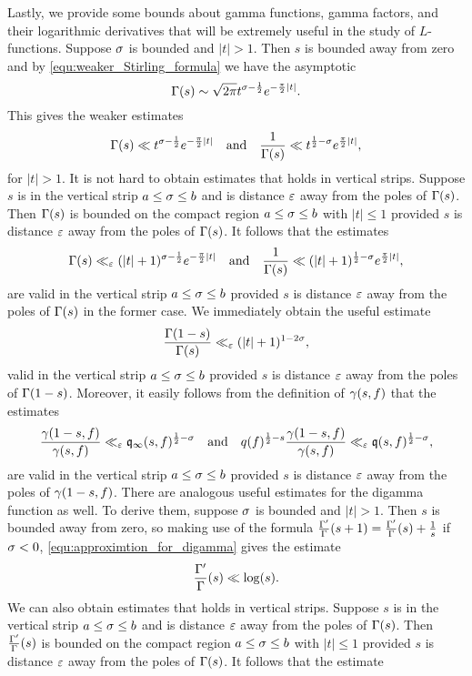     Lastly, we provide some bounds about gamma functions, gamma factors, and their logarithmic derivatives that will be extremely useful in the study of $L$-functions. Suppose $\sigma$ is bounded and $|t| > 1$. Then $s$ is bounded away from zero and by \cref{equ:weaker_Stirling_formula} we have the asymptotic
    \[
      \Gamma(s) \sim \sqrt{2\pi}t^{\sigma-\frac{1}{2}}e^{-\frac{\pi}{2}|t|}.
    \]
    This gives the weaker estimates
    \[
      \Gamma(s) \ll t^{\sigma-\frac{1}{2}}e^{-\frac{\pi}{2}|t|} \quad \text{and} \quad \frac{1}{\Gamma(s)} \ll t^{\frac{1}{2}-\sigma}e^{\frac{\pi}{2}|t|},
    \]
    for $|t| > 1$. It is not hard to obtain estimates that holds in vertical strips. Suppose $s$ is in the vertical strip $a \le \sigma \le b$ and is distance $\varepsilon$ away from the poles of $\Gamma(s)$. Then $\Gamma(s)$ is bounded on the compact region $a \le \sigma \le b$ with $|t| \le 1$ provided $s$ is distance $\varepsilon$ away from the poles of $\Gamma(s)$. It follows that the estimates
    \begin{equation}\label{equ:modified_gamma_estimates}
      \Gamma(s) \ll_{\varepsilon} (|t|+1)^{\sigma-\frac{1}{2}}e^{-\frac{\pi}{2}|t|} \quad \text{and} \quad \frac{1}{\Gamma(s)} \ll (|t|+1)^{\frac{1}{2}-\sigma}e^{\frac{\pi}{2}|t|},
    \end{equation}
    are valid in the vertical strip $a \le \sigma \le b$ provided $s$ is distance $\varepsilon$ away from the poles of $\Gamma(s)$ in the former case. We immediately obtain the useful estimate
    \[
      \frac{\Gamma(1-s)}{\Gamma(s)} \ll_{\varepsilon} (|t|+1)^{1-2\sigma},
    \]
    valid in the vertical strip $a \le \sigma \le b$ provided $s$ is distance $\varepsilon$ away from the poles of $\Gamma(1-s)$. Moreover, it easily follows from the definition of $\gamma(s,f)$ that the estimates
    \begin{equation}\label{equ:gamma_factor_analytic_conductor_estimate}
      \frac{\gamma(1-s,f)}{\gamma(s,f)} \ll_{\varepsilon} \mathfrak{q}_{\infty}(s,f)^{\frac{1}{2}-\sigma} \quad \text{and} \quad q(f)^{\frac{1}{2}-s}\frac{\gamma(1-s,f)}{\gamma(s,f)} \ll_{\varepsilon} \mathfrak{q}(s,f)^{\frac{1}{2}-\sigma},
    \end{equation}
    are valid in the vertical strip $a \le \sigma \le b$ provided $s$ is distance $\varepsilon$ away from the poles of $\gamma(1-s,f)$. There are analogous useful estimates for the digamma function as well. To derive them, suppose $\sigma$ is bounded and $|t| > 1$. Then $s$ is bounded away from zero, so making use of the formula $\frac{\Gamma'}{\Gamma}(s+1) = \frac{\Gamma'}{\Gamma}(s)+\frac{1}{s}$ if $\sigma < 0$, \cref{equ:approximtion_for_digamma} gives the estimate
    \[
      \frac{\Gamma'}{\Gamma}(s) \ll \log(s).
    \]
    We can also obtain estimates that holds in vertical strips. Suppose $s$ is in the vertical strip $a \le \sigma \le b$ and is distance $\varepsilon$ away from the poles of $\Gamma(s)$. Then $\frac{\Gamma'}{\Gamma}(s)$ is bounded on the compact region $a \le \sigma \le b$ with $|t| \le 1$ provided $s$ is distance $\varepsilon$ away from the poles of $\Gamma(s)$. It follows that the estimate
